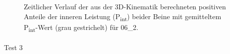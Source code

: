 \documentclass[
  letterpaper,
  DIV=11]{scrartcl}
\makeatletter
\let\oldparagraph\paragraph
\renewcommand{\paragraph}{
    \@ifstar
      \xxxParagraphStar
      \xxxParagraphNoStar
  }
\newcommand{\xxxParagraphStar}[1]{\oldparagraph*{#1}\mbox{}}
\newcommand{\xxxParagraphNoStar}[1]{\oldparagraph{#1}\mbox{}}
\makeatother
\begin{document}
\begin{figure}


\caption{\label{fig-PInt_Kinematik_06_2}Zeitlicher Verlauf der aus der
3D-Kinematik berechneten positiven Anteile der inneren Leistung
(P\textsubscript{int}) beider Beine mit gemitteltem
P\textsubscript{int}-Wert (grau gestrichelt) für 06\_2.}

\end{figure}%

\paragraph{Test 3}
\end{document}
